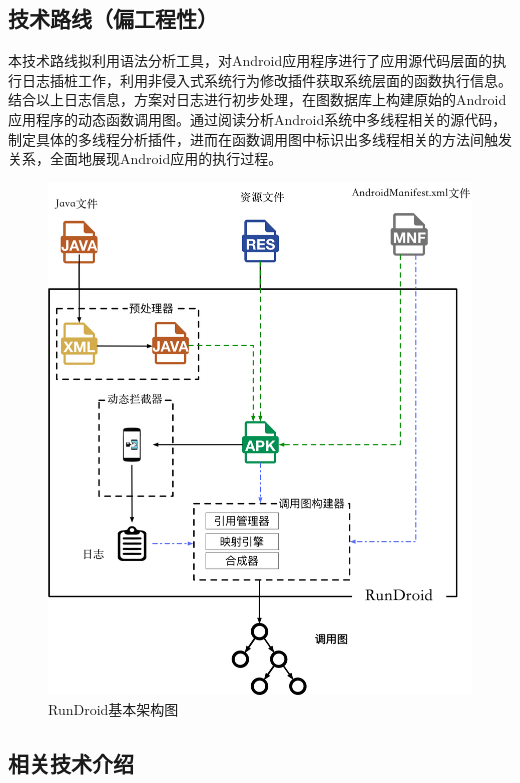 \subsection{技术路线（偏工程性）}
本技术路线拟利用语法分析工具，对Android应用程序进行了应用源代码层面的执行日志插桩工作，利用非侵入式系统行为修改插件获取系统层面的函数执行信息。结合以上日志信息，方案对日志进行初步处理，在图数据库上构建原始的Android应用程序的动态函数调用图。通过阅读分析Android系统中多线程相关的源代码，制定具体的多线程分析插件，进而在函数调用图中标识出多线程相关的方法间触发关系，全面地展现Android应用的执行过程。
 
 
\begin{figure}
\centering
\includegraphics[width=\textwidth]{./Figures/rundroid-overview.png}
\caption{ RunDroid基本架构图}
\label{fig:rundroid_overview}
\end{figure}


\subsection{相关技术介绍}

